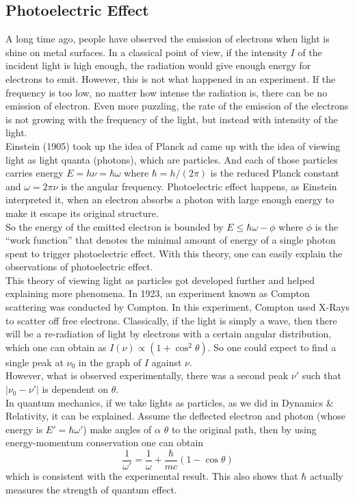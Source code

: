 \subsection{Photoelectric Effect}
A long time ago, people have observed the emission of electrons when light is shine on metal surfaces.
In a classical point of view, if the intensity $I$ of the incident light is high enough, the radiation would give enough energy for electrons to emit.
However, this is not what happened in an experiment.
If the frequency is too low, no matter how intense the radiation is, there can be no emission of electron.
Even more puzzling, the rate of the emission of the electrons is not growing with the frequency of the light, but instead with intensity of the light.\\
Einstein (1905) took up the idea of Planck ad came up with the idea of viewing light as light quanta (photons), which are particles.
And each of those particles carries energy $E=h\nu=\hbar\omega$ where $\hbar=h/(2\pi)$ is the reduced Planck constant and $\omega=2\pi\nu$ is the angular frequency.
Photoelectric effect happens, as Einstein interpreted it, when an electron absorbs a photon with large enough energy to make it escape its original structure.\\
So the energy of the emitted electron is bounded by $E\le \hbar\omega-\phi$ where $\phi$ is the ``work function'' that denotes the minimal amount of energy of a single photon spent to trigger photoelectric effect.
With this theory, one can easily explain the observations of photoelectric effect.\\
This theory of viewing light as particles got developed further and helped explaining more phenomena.
In 1923, an experiment known as Compton scattering was conducted by Compton.
In this experiment, Compton used X-Rays to scatter off free electrons.
Classically, if the light is simply a wave, then there will be a re-radiation of light by electrons with a certain angular distribution, which one can obtain as $I(\nu)\propto(1+\cos^2\theta)$.
So one could expect to find a single peak at $\nu_0$ in the graph of $I$ against $\nu$.\\
However, what is observed experimentally, there was a second peak $\nu'$ such that $|\nu_0-\nu'|$ is dependent on $\theta$.\\
In quantum mechanics, if we take lights as particles, as we did in Dynamics \& Relativity, it can be explained.
Assume the deflected electron and photon (whose energy is $E'=\hbar\omega'$) make angles of $\alpha$ $\theta$ to the original path, then by using energy-momentum conservation one can obtain
$$\frac{1}{\omega'}=\frac{1}{\omega}+\frac{\hbar}{mc}(1-\cos\theta)$$
which is consistent with the experimental result.
This also shows that $\hbar$ actually measures the strength of quantum effect.
